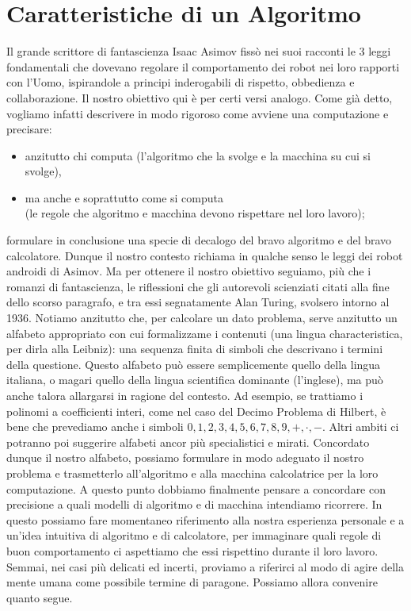 \section{Caratteristiche di un Algoritmo}

Il grande scrittore di fantascienza Isaac Asimov fissò nei suoi racconti le 3 leggi
fondamentali che dovevano regolare il comportamento dei robot nei loro rapporti
con l'Uomo, ispirandole a principi inderogabili di rispetto, obbedienza e collaborazione.
Il nostro obiettivo qui è per certi versi analogo. Come già detto, vogliamo
infatti descrivere in modo rigoroso come avviene una computazione e precisare:

\begin{itemize}
    \item anzitutto chi computa (l'algoritmo che la svolge e la macchina su cui si svolge),
    \item ma anche e soprattutto come si computa\\
          (le regole che algoritmo e macchina
          devono rispettare nel loro lavoro);
\end{itemize}

formulare in conclusione una specie di decalogo del bravo algoritmo e del bravo
calcolatore. Dunque il nostro contesto richiama in qualche senso le leggi dei robot androidi di Asimov.
Ma per ottenere il nostro obiettivo seguiamo, più che i romanzi di fantascienza, le riflessioni che gli
autorevoli scienziati citati alla fine dello scorso paragrafo, e tra essi segnatamente Alan Turing,
svolsero intorno al 1936.
Notiamo anzitutto che, per calcolare un dato problema, serve anzitutto un alfabeto appropriato con cui formalizzame i
contenuti (una lingua characteristica, per dirla alla Leibniz): una sequenza finita di simboli che descrivano i termini
della questione. Questo alfabeto può essere semplicemente quello della lingua italiana, o magari quello della lingua
scientifica dominante (l'inglese), ma può anche talora allargarsi in ragione del contesto.
Ad esempio, se trattiamo i polinomi a coefficienti interi, come nel caso del Decimo Problema di Hilbert,
è bene che prevediamo anche i simboli $0, 1, 2, 3, 4, 5, 6, 7, 8, 9, +, \cdot, -$. Altri ambiti ci potranno
poi suggerire alfabeti ancor più specialistici e mirati. Concordato dunque il nostro alfabeto,
possiamo formulare in modo adeguato il nostro problema e trasmetterlo all'algoritmo e alla macchina calcolatrice
per la loro computazione.
A questo punto dobbiamo finalmente pensare a concordare con precisione a quali
modelli di algoritmo e di macchina intendiamo ricorrere. In questo possiamo fare
momentaneo riferimento alla nostra esperienza personale e a un'idea intuitiva di
algoritmo e di calcolatore, per immaginare quali regole di buon comportamento ci
aspettiamo che essi rispettino durante il loro lavoro. Semmai, nei casi più delicati
ed incerti, proviamo a riferirci al modo di agire della mente umana come possibile
termine di paragone. Possiamo allora convenire quanto segue.

